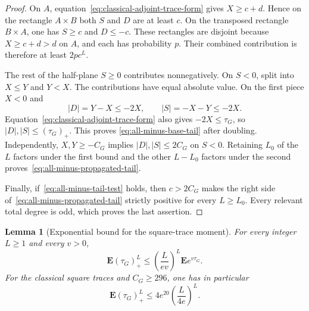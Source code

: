 \documentclass[11pt,reqno]{amsart}
\theoremstyle{plain}
\newtheorem{lemma}[theorem]{Lemma}
\theoremstyle{definition}
\begin{document}
\begin{proof}
On $A$, equation~\eqref{eq:classical-adjoint-trace-form} gives
$X\geq c+d$.  Hence on the rectangle $A\times B$ both $S$ and $D$ are at
least $c$.  On the transposed rectangle $B\times A$, one has
$S\geq c$ and $D\leq-c$.  These rectangles are disjoint because
$X\geq c+d>d$ on $A$, and each has probability $p$.  Their combined
contribution is therefore at least $2pc^L$.

The rest of the half-plane $S\geq0$ contributes nonnegatively.  On
$S<0$, split into $X\leq Y$ and $Y<X$.  The contributions have equal
absolute value.  On the first piece $X<0$ and
\[
 |D|=Y-X\leq-2X,
 \qquad
 |S|=-X-Y\leq-2X.
\]
Equation~\eqref{eq:classical-adjoint-trace-form} also gives
$-2X\leq\tau_G$, so $|D|,|S|\leq(\tau_G)_+$.  This proves
\eqref{eq:all-minus-base-tail} after doubling.  Independently,
$X,Y\geq-C_G$ implies $|D|,|S|\leq2C_G$ on $S<0$.  Retaining $L_0$ of
the $L$ factors under the first bound and the other $L-L_0$ factors under
the second proves~\eqref{eq:all-minus-propagated-tail}.

Finally, if~\eqref{eq:all-minus-tail-test} holds, then $c>2C_G$ makes the
right side of~\eqref{eq:all-minus-propagated-tail} strictly positive for
every $L\geq L_0$.  Every relevant total degree is odd, which proves the
last assertion.
\end{proof}

\begin{lemma}[Exponential bound for the square-trace moment]
\label{lem:square-trace-moment-mgf}
For every integer $L\geq1$ and every $v>0$,
\[
 \mathbf E(\tau_G)_+^L
 \leq\left(\frac{L}{ev}\right)^L\mathbf E e^{v\tau_G}.
\]
For the classical square traces and $C_G\geq296$, one has in particular
\begin{equation}
\label{eq:square-trace-v4}
 \mathbf E(\tau_G)_+^L
 \leq4e^{20}\left(\frac{L}{4e}\right)^L.
\end{equation}
\end{lemma}
\end{document}
